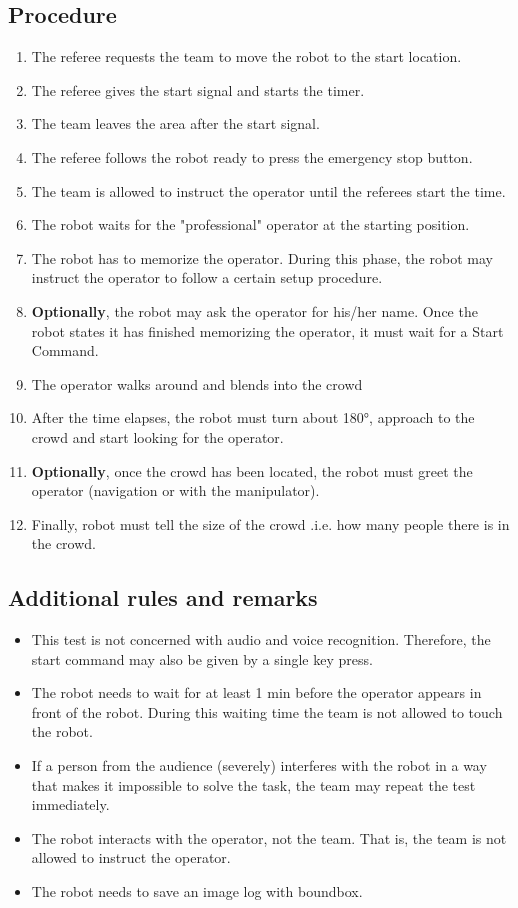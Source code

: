 \subsection*{Procedure}
	\begin{enumerate}[nosep]
		\item The referee requests the team to move the robot to the start location.
		\item The referee gives the start signal and starts the timer.
		\item The team leaves the area after the start signal.		
		\item The referee follows the robot ready to press the emergency stop button.
		
		\item The team is allowed to instruct the operator until the referees start the time.
		\item The robot waits for the "professional" operator at the starting position.
		\item The robot has to memorize the operator. During this phase, the robot may instruct the operator to follow a certain setup procedure.
		\item \textbf{Optionally}, the robot may ask the operator for his/her name.
		Once the robot states it has finished memorizing the operator, it must wait for a Start Command.
		\item The operator walks around and blends into the crowd
		\item After the time elapses, the robot must turn about 180°, approach to the crowd and start looking for the operator.
		\item \textbf{Optionally}, once the crowd has been located, the robot must greet the operator (navigation or with the manipulator).
		\item Finally, robot must tell the size of the crowd .i.e. how many people there is in the crowd.
		

	\end{enumerate}

\subsection*{Additional rules and remarks}
\begin{itemize}[nosep]
	\item This test is not concerned with audio and voice recognition. Therefore, the start command may also be given by a single key press.
	\item The robot needs to wait for at least 1 min before the operator appears in front of the robot. During this waiting time the team is not allowed to touch the robot.
	\item If a person from the audience (severely) interferes with the robot in a way that makes it impossible to solve the task, the team may repeat the test immediately.
	\item The robot interacts with the operator, not the team. That is, the team is not allowed to instruct the operator.
    \item The robot needs to save an image log with boundbox.
\end{itemize}

